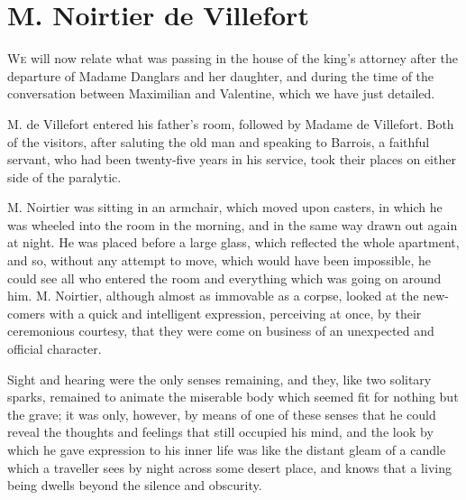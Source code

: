 \chapter{M. Noirtier de Villefort}

 \lettrine{W}{e} will now relate what was passing in the house of the king's attorney after the departure of Madame Danglars and her daughter, and during the time of the conversation between Maximilian and Valentine, which we have just detailed. 

 M. de Villefort entered his father's room, followed by Madame de Villefort. Both of the visitors, after saluting the old man and speaking to Barrois, a faithful servant, who had been twenty-five years in his service, took their places on either side of the paralytic. 

 M. Noirtier was sitting in an armchair, which moved upon casters, in which he was wheeled into the room in the morning, and in the same way drawn out again at night. He was placed before a large glass, which reflected the whole apartment, and so, without any attempt to move, which would have been impossible, he could see all who entered the room and everything which was going on around him. M. Noirtier, although almost as immovable as a corpse, looked at the new-comers with a quick and intelligent expression, perceiving at once, by their ceremonious courtesy, that they were come on business of an unexpected and official character. 

 Sight and hearing were the only senses remaining, and they, like two solitary sparks, remained to animate the miserable body which seemed fit for nothing but the grave; it was only, however, by means of one of these senses that he could reveal the thoughts and feelings that still occupied his mind, and the look by which he gave expression to his inner life was like the distant gleam of a candle which a traveller sees by night across some desert place, and knows that a living being dwells beyond the silence and obscurity. 


